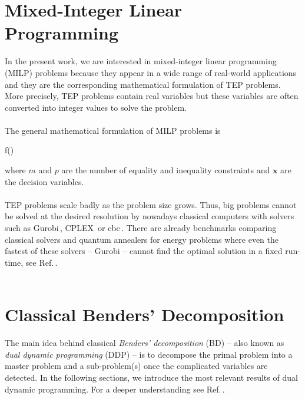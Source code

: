 \section{Mixed-Integer Linear Programming}
In the present work, we are interested in mixed-integer linear programming (MILP) problems because they appear in a wide range of real-world applications and they are the corresponding mathematical formulation of TEP problems. More precisely, TEP problems contain real variables but these variables are often converted into integer values to solve the problem.\\\\
The general mathematical formulation of MILP problems is
\begin{mini!}[4]
	{}{f()}{\label{eq: MILP}}{}{}
\end{mini!}
where $m$ and $p$ are the number of equality and inequality constraints and $\mathbf{x}$ are the decision variables.\\\\
TEP problems scale badly as the problem size grows. Thus, big problems cannot be solved at the desired resolution by nowadays classical computers with solvers such as Gurobi\,\cite{gurobi}, CPLEX\,\cite{cplex2009v12} or cbc\,\cite{cbc}. There are already benchmarks comparing classical solvers and quantum annealers for energy problems where even the fastest of these solvers -- Gurobi -- cannot find the optimal solution in a fixed run-time, see Ref.\,\cite{Fernandez-Campoamor2021CommunityAnnealing}. \\\\
\section{Classical Benders' Decomposition}
The main idea behind classical \textit{Benders' decomposition} (BD) -- also known as \textit{dual dynamic programming} (DDP) -- is to decompose the primal problem into a master problem and a sub-problem(s) once the complicated variables are detected. In the following sections, we introduce the most relevant results of dual dynamic programming. For a deeper understanding see Ref.\,\cite{bierlaire2018}.
